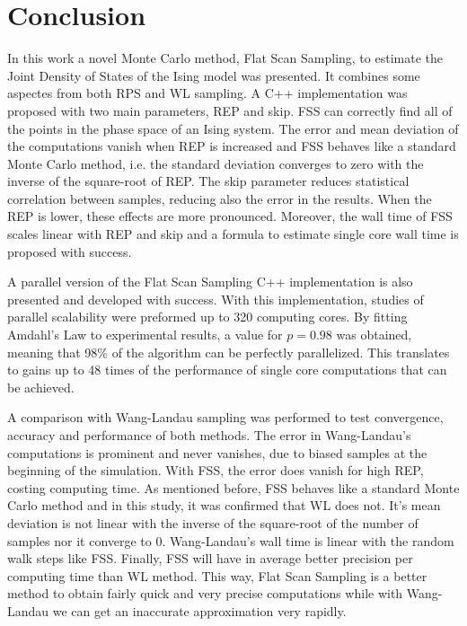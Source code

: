 \chapter{Conclusion}

	In this work a novel Monte Carlo method, Flat Scan Sampling, to estimate the Joint Density of States of the Ising model was presented. It combines some aspectes from both RPS and WL sampling. A C++ implementation was proposed with two main parameters, REP and skip. FSS can correctly find all of the points in the phase space of an Ising system. The error and mean deviation of the computations vanish when REP is increased and FSS behaves like a standard Monte Carlo method, i.e. the standard deviation converges to zero with the inverse of the square-root of REP. The skip parameter reduces statistical correlation between samples, reducing also the error in the results. When the REP is lower, these effects are more pronounced. Moreover, the wall time of FSS scales linear with REP and skip and a formula to estimate single core wall time is proposed with success.

	A parallel version of the Flat Scan Sampling C++ implementation is also presented and developed with success. With this implementation, studies of parallel scalability were preformed up to 320 computing cores. By fitting Amdahl's Law to experimental results, a value for $p=0.98$ was obtained, meaning that 98\% of the algorithm can be perfectly parallelized. This translates to gains up to 48 times of the performance of single core computations that	 can be achieved.

	A comparison with Wang-Landau sampling was performed to test convergence, accuracy and performance of both methods. The error in Wang-Landau's computations is prominent and never vanishes, due to biased samples at the beginning of the simulation. With FSS, the error does vanish for high REP, costing computing time. As mentioned before, FSS behaves like a standard Monte Carlo method and in this study, it was confirmed that WL does not. It's mean deviation is not linear with the inverse of the square-root of the number of samples nor it converge to 0. Wang-Landau's wall time is linear with the random walk steps like FSS. Finally, FSS will have in average better precision per computing time than WL method. This way, Flat Scan Sampling is a better method to obtain fairly quick and very precise computations while with Wang-Landau we can get an inaccurate approximation very rapidly.

